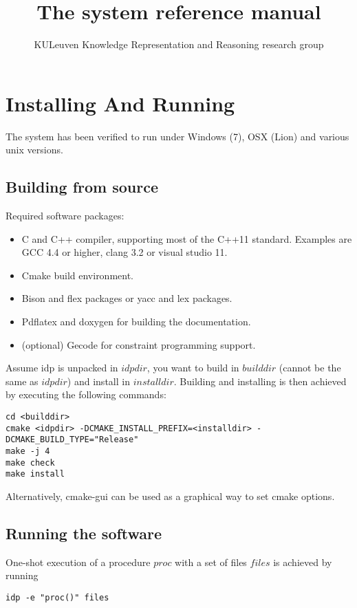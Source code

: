 \documentclass[a4]{article}
\title{The \idp system reference manual}
\author{KULeuven Knowledge Representation and Reasoning research group}
\begin{document}
\maketitle
\setlength{\parindent}{0pt}


\section{Installing And Running}

The system has been verified to run under Windows (7), OSX (Lion) and various unix versions.

\subsection{Building from source}
Required software packages:
\begin{itemize}
  \item C and C++ compiler, supporting most of the C++11 standard. Examples are GCC 4.4 or higher, clang 3.2 or visual studio 11.
  \item Cmake build environment. 
  \item Bison and flex packages or yacc and lex packages.
  \item Pdflatex and doxygen for building the documentation.
  \item (optional) Gecode for constraint programming support.
\end{itemize}

Assume idp is unpacked in $idpdir$, you want to build in $builddir$ (cannot be the same as $idpdir$) and install in $installdir$. Building and installing is then achieved by executing the following commands:
\begin{lstlisting}
cd <builddir>
cmake <idpdir> -DCMAKE_INSTALL_PREFIX=<installdir> -DCMAKE_BUILD_TYPE="Release"
make -j 4
make check
make install
\end{lstlisting}

Alternatively, cmake-gui can be used as a graphical way to set cmake options.

\subsection{Running the software}
One-shot execution of a procedure $proc$ with a set of files $files$ is achieved by running
\begin{lstlisting}
idp -e "proc()" files
\end{lstlisting}
\end{document}
